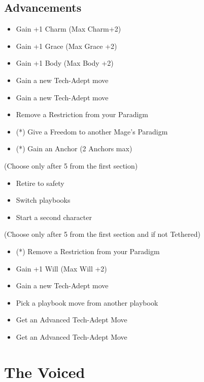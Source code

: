 \documentclass[10pt,twoside,openright]{memoir}
\begin{document}
\hypertarget{advancements-6}{%
\subsection{Advancements}\label{advancements-6}}

\begin{itemize}
\tightlist
\item
  Gain +1 Charm (Max Charm+2)
\item
  Gain +1 Grace (Max Grace +2)
\item
  Gain +1 Body (Max Body +2)
\item
  Gain a new Tech-Adept move
\item
  Gain a new Tech-Adept move
\item
  Remove a Restriction from your Paradigm
\item
  (*) Give a Freedom to another Mage's Paradigm
\item
  (*) Gain an Anchor (2 Anchors max)
\end{itemize}

(Choose only after 5 from the first section)

\begin{itemize}
\tightlist
\item
  Retire to safety
\item
  Switch playbooks
\item
  Start a second character
\end{itemize}

(Choose only after 5 from the first section and if not Tethered)

\begin{itemize}
\tightlist
\item
  (*) Remove a Restriction from your Paradigm
\item
  Gain +1 Will (Max Will +2)
\item
  Gain a new Tech-Adept move
\item
  Pick a playbook move from another playbook
\item
  Get an Advanced Tech-Adept Move
\item
  Get an Advanced Tech-Adept Move
\end{itemize}

\newpage

\hypertarget{the-voiced}{%
\section{The Voiced}\label{the-voiced}}
\end{document}
